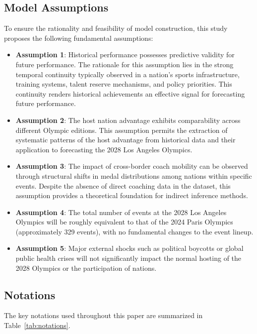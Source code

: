 \documentclass{mcmthesis}
\begin{document}
\subsection{Model Assumptions}

To ensure the rationality and feasibility of model construction, this study proposes the following fundamental assumptions:

\begin{itemize}[leftmargin=*, labelsep=0.5em, itemsep=0.5pc]
    \item \textbf{Assumption 1}: Historical performance possesses predictive validity for future performance. The rationale for this assumption lies in the strong temporal continuity typically observed in a nation's sports infrastructure, training systems, talent reserve mechanisms, and policy priorities. This continuity renders historical achievements an effective signal for forecasting future performance.

    \item \textbf{Assumption 2}: The host nation advantage exhibits comparability across different Olympic editions. This assumption permits the extraction of systematic patterns of the host advantage from historical data and their application to forecasting the 2028 Los Angeles Olympics.

    \item \textbf{Assumption 3}: The impact of cross-border coach mobility can be observed through structural shifts in medal distributions among nations within specific events. Despite the absence of direct coaching data in the dataset, this assumption provides a theoretical foundation for indirect inference methods.

    \item \textbf{Assumption 4}: The total number of events at the 2028 Los Angeles Olympics will be roughly equivalent to that of the 2024 Paris Olympics (approximately 329 events), with no fundamental changes to the event lineup.

    \item \textbf{Assumption 5}: Major external shocks such as political boycotts or global public health crises will not significantly impact the normal hosting of the 2028 Olympics or the participation of nations.
\end{itemize}
\subsection{Notations}
The key notations used throughout this paper are summarized in Table~\ref{tab:notations}.
\end{document}
